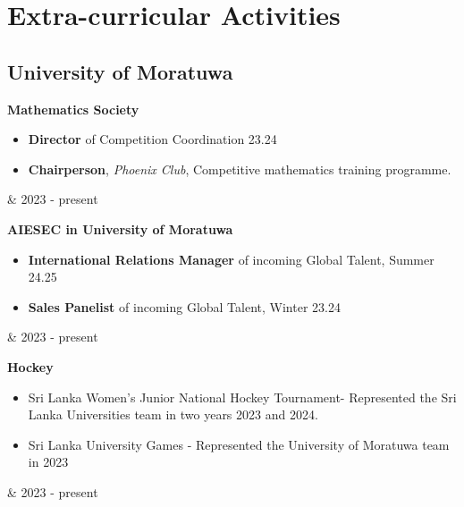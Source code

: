 \documentclass[10pt, a4paper]{article}
\newenvironment{highlights}{
        \begin{itemize}[
                topsep=0pt,
                parsep=0.10 cm,
                partopsep=0pt,
                itemsep=0pt,
                after=\vspace{-1\baselineskip},
                leftmargin=0.4 cm + 3pt
            ]
    }{
        \end{itemize}
    } %
\let\originalTabularx\tabularx
\let\originalEndTabularx\endtabularx
\renewenvironment{tabularx}{\bgroup\centering\originalTabularx}{\originalEndTabularx\par\egroup}
\begin{document}
     \section{Extra-curricular Activities}
	\subsection{University of Moratuwa}
		\begin{tabularx}{\textwidth-0.4 cm-0.13cm}{K{0.2 cm} R{4.1 cm}}
            \textbf{Mathematics Society}
            \vspace{0.10 cm}
            \begin{highlights}
                \item \textbf{Director} of Competition Coordination 23.24
                \item \textbf{Chairperson}, \textit{Phoenix Club}, Competitive mathematics training programme. \end{highlights}
            &
            2023 - present
           \end{tabularx}
			
		\vspace{0.2 cm}
		\begin{tabularx}{\textwidth-0.4 cm-0.13cm}{K{0.2 cm} R{4.1 cm}}
            \textbf{AIESEC in University of Moratuwa}
            \vspace{0.10 cm}
            \begin{highlights}
	        \item \textbf{International Relations Manager} of incoming Global Talent, Summer 24.25
	        \item \textbf{Sales Panelist} of incoming Global Talent, Winter 23.24
	        \end{highlights}
            &
            2023 - present
           \end{tabularx}
			
		\vspace{0.2 cm}	
		\begin{tabularx}{\textwidth-0.4 cm-0.13cm}{K{0.2 cm} R{4.1 cm}}
            \textbf{Hockey}
            \vspace{0.10 cm}
             \begin{highlights}
	        \item Sri Lanka Women's Junior National Hockey Tournament- Represented the Sri Lanka Universities team in two years 2023 and 2024.
	        \item Sri Lanka University Games - Represented the University of Moratuwa team in 2023
	        \end{highlights}
            &
            2023 - present
           \end{tabularx}
\end{document}
